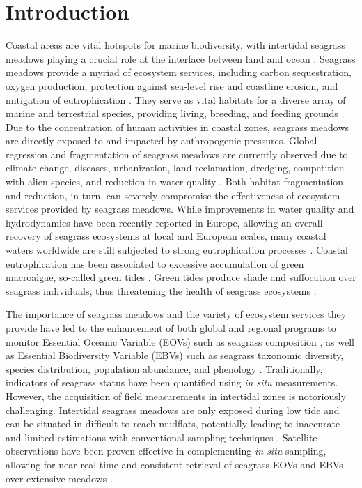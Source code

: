 \documentclass[
  number]{elsarticle}
\begin{document}
\section{Introduction}\label{introduction}

Coastal areas are vital hotspots for marine biodiversity, with
intertidal seagrass meadows playing a crucial role at the interface
between land and ocean \citep{unsworth2022}. Seagrass meadows provide a
myriad of ecosystem services, including carbon sequestration, oxygen
production, protection against sea-level rise and coastline erosion, and
mitigation of eutrophication \citep{unsworth2022, sousa2019blue}. They
serve as vital habitats for a diverse array of marine and terrestrial
species, providing living, breeding, and feeding grounds
\citep{gardner2018, Zoffoli2022, jankowska2019}. Due to the
concentration of human activities in coastal zones, seagrass meadows are
directly exposed to and impacted by anthropogenic pressures. Global
regression and fragmentation of seagrass meadows are currently observed
due to climate change, diseases, urbanization, land reclamation,
dredging, competition with alien species, and reduction in water quality
\citep{nguyen2021, soissons2018, orth2006, lin2018, duffy2019, rasheed2011long, chefaoui2018dramatic, sousa2019blue}.
Both habitat fragmentation and reduction, in turn, can severely
compromise the effectiveness of ecosystem services provided by seagrass
meadows. While improvements in water quality and hydrodynamics have been
recently reported in Europe, allowing an overall recovery of seagrass
ecosystems at local and European scales, many coastal waters worldwide
are still subjected to strong eutrophication processes
\citep{deSantos2019, Zoffoli2021, sousa2019blue}. Coastal eutrophication
has been associated to excessive accumulation of green macroalgae,
so-called green tides \citep{devlin2023nutrients}. Green tides produce
shade and suffocation over seagrass individuals, thus threatening the
health of seagrass ecosystems \citep{wang2022}.

The importance of seagrass meadows and the variety of ecosystem services
they provide have led to the enhancement of both global and regional
programs to monitor Essential Oceanic Variable (EOVs) such as seagrass
composition \citep{Miloslavich2018}, as well as Essential Biodiversity
Variable (EBVs) such as seagrass taxonomic diversity, species
distribution, population abundance, and phenology \citep{Pereira2013}.
Traditionally, indicators of seagrass status have been quantified using
\emph{in situ} measurements. However, the acquisition of field
measurements in intertidal zones is notoriously challenging. Intertidal
seagrass meadows are only exposed during low tide and can be situated in
difficult-to-reach mudflats, potentially leading to inaccurate and
limited estimations with conventional sampling techniques
\citep{nijland2019}. Satellite observations have been proven effective
in complementing \emph{in situ} sampling, allowing for near real-time
and consistent retrieval of seagrass EOVs and EBVs over extensive
meadows
\citep{Zoffoli2021, xu2021, Traganos2018, coffer2023, davies2024intertidal, davies2024sentinel}.
\end{document}
